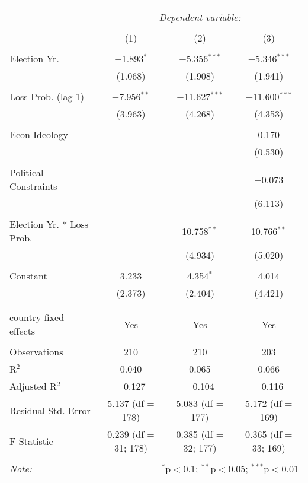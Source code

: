 
\begingroup 
\footnotesize 
\begin{tabular}{@{\extracolsep{5pt}}lccc} 
\\[-1.8ex]\hline 
\hline \\[-1.8ex] 
 & \multicolumn{3}{c}{\textit{Dependent variable:}} \\ 
\cline{2-4} 
\\[-1.8ex] & (1) & (2) & (3)\\ 
\hline \\[-1.8ex] 
 Election Yr. & $-$1.893$^{*}$ & $-$5.356$^{***}$ & $-$5.346$^{***}$ \\ 
  & (1.068) & (1.908) & (1.941) \\ 
  & & & \\ 
 Loss Prob. (lag 1) & $-$7.956$^{**}$ & $-$11.627$^{***}$ & $-$11.600$^{***}$ \\ 
  & (3.963) & (4.268) & (4.353) \\ 
  & & & \\ 
 Econ Ideology &  &  & 0.170 \\ 
  &  &  & (0.530) \\ 
  & & & \\ 
 Political Constraints &  &  & $-$0.073 \\ 
  &  &  & (6.113) \\ 
  & & & \\ 
 Election Yr. * Loss Prob. &  & 10.758$^{**}$ & 10.766$^{**}$ \\ 
  &  & (4.934) & (5.020) \\ 
  & & & \\ 
 Constant & 3.233 & 4.354$^{*}$ & 4.014 \\ 
  & (2.373) & (2.404) & (4.421) \\ 
  & & & \\ 
\hline \\[-1.8ex] 
country fixed effects & Yes & Yes & Yes \\ 
\hline \\[-1.8ex] 
Observations & 210 & 210 & 203 \\ 
R$^{2}$ & 0.040 & 0.065 & 0.066 \\ 
Adjusted R$^{2}$ & $-$0.127 & $-$0.104 & $-$0.116 \\ 
Residual Std. Error & 5.137 (df = 178) & 5.083 (df = 177) & 5.172 (df = 169) \\ 
F Statistic & 0.239 (df = 31; 178) & 0.385 (df = 32; 177) & 0.365 (df = 33; 169) \\ 
\hline 
\hline \\[-1.8ex] 
\textit{Note:}  & \multicolumn{3}{r}{$^{*}$p$<$0.1; $^{**}$p$<$0.05; $^{***}$p$<$0.01} \\ 
\end{tabular} 
\endgroup 
